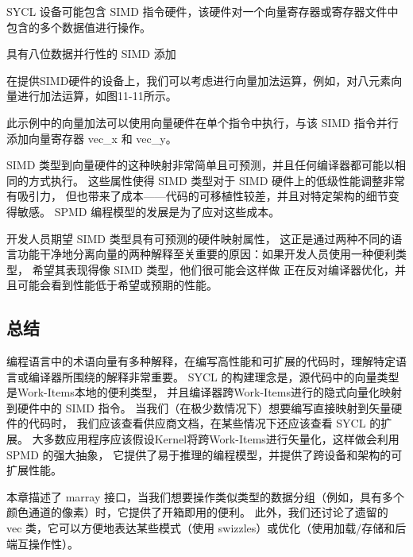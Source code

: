 SYCL 设备可能包含 SIMD 指令硬件，该硬件对一个向量寄存器或寄存器文件中包含的多个数据值进行操作。

{\color{red} 具有八位数据并行性的 SIMD 添加}

在提供SIMD硬件的设备上，我们可以考虑进行向量加法运算，例如，对八元素向量进行加法运算，如图11-11所示。

此示例中的向量加法可以使用向量硬件在单个指令中执行，与该 SIMD 指令并行添加向量寄存器 vec\_x 和 vec\_y。

SIMD 类型到向量硬件的这种映射非常简单且可预测，并且任何编译器都可能以相同的方式执行。 
这些属性使得 SIMD 类型对于 SIMD 硬件上的低级性能调整非常有吸引力，
但也带来了成本——代码的可移植性较差，并且对特定架构的细节变得敏感。 SPMD 编程模型的发展是为了应对这些成本。

开发人员期望 SIMD 类型具有可预测的硬件映射属性，
这正是通过两种不同的语言功能干净地分离向量的两种解释至关重要的原因：如果开发人员使用一种便利类型，
希望其表现得像 SIMD 类型，他们很可能会这样做 正在反对编译器优化，并且可能会看到性能低于希望或预期的性能。

\subsection{总结}
编程语言中的术语向量有多种解释，在编写高性能和可扩展的代码时，理解特定语言或编译器所围绕的解释非常重要。 
SYCL 的构建理念是，源代码中的向量类型是Work-Items本地的便利类型，
并且编译器跨Work-Items进行的隐式向量化映射到硬件中的 SIMD 指令。 
当我们（在极少数情况下）想要编写直接映射到矢量硬件的代码时，
我们应该查看供应商文档，在某些情况下还应该查看 SYCL 的扩展。 
大多数应用程序应该假设Kernel将跨Work-Items进行矢量化，这样做会利用 SPMD 的强大抽象，
它提供了易于推理的编程模型，并提供了跨设备和架构的可扩展性能。

本章描述了 marray 接口，当我们想要操作类似类型的数据分组（例如，具有多个颜色通道的像素）时，它提供了开箱即用的便利。 
此外，我们还讨论了遗留的 vec 类，它可以方便地表达某些模式（使用 swizzles）或优化（使用加载/存储和后端互操作性）。